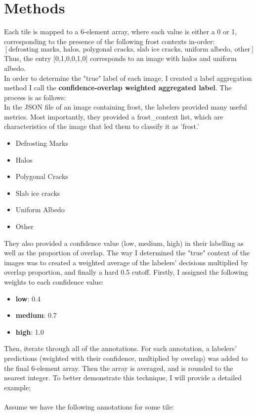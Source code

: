 \documentclass[11pt]{article}
\begin{document}
\section{Methods}
Each tile is mapped to a 6-element array, where each value is either a 0 or 1, corresponding to the presence of the following frost contexts in-order:
$$[\text{defrosting marks, halos, polygonal cracks, slab ice cracks, uniform albedo, other}]$$
Thus, the entry [0,1,0,0,1,0] corresponds to an image with halos and uniform albedo.\\
In order to determine the "true" label of each image, I created a label aggregation method I call the \textbf{confidence-overlap weighted aggregated label}. The process is as follows:\\
In the JSON file of an image containing frost, the labelers provided many useful metrics. Most importantly, they provided a frost\_context list, which are characteristics of the image that led them to classify it as 'frost.' 
\begin{itemize}
    \item Defrosting Marks
    \item Halos
    \item Polygonal Cracks
    \item Slab ice cracks
    \item Uniform Albedo
    \item Other
\end{itemize}
They also provided a confidence value (low, medium, high) in their labelling as well as the proportion of overlap. The way I determined the "true" context of the images was to created a weighted average of the labelers' decisions multiplied by overlap proportion, and finally a hard 0.5 cutoff. Firstly, I assigned the following weights to each confidence value:
\begin{itemize}
    \item \textbf{low}: 0.4
    \item \textbf{medium}: 0.7
    \item \textbf{high}: 1.0
\end{itemize}
Then, iterate through all of the annotations. For each annotation, a labelers' predictions (weighted with their confidence, multiplied by overlap) was added to the final 6-element array. Then the array is averaged, and is rounded to the nearest integer. To better demonstrate this technique, I will provide a detailed example; \\\\
Assume we have the following annotations for some tile:
\end{document}
